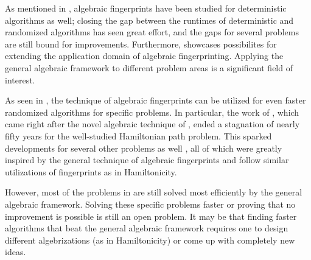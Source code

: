 As mentioned in , algebraic fingerprints 
have been studied for deterministic algorithms as well; closing 
the gap between the runtimes of deterministic and randomized algorithms 
has seen great effort, and the gaps for several problems are still bound for improvements.
Furthermore,  showcases possibilites for extending the 
application domain of algebraic fingerprinting. Applying the general algebraic framework 
to different problem areas is a significant field of interest.

As seen in , 
the technique of algebraic fingerprints can be utilized for even 
faster randomized algorithms for specific problems. 
In particular, the work of \citeauthor{Björklund14}, which came right
after the novel algebraic technique of \cite{Koutis08}, ended a stagnation of 
nearly fifty years for the well-studied Hamiltonian path problem. 
This sparked developments for several other 
problems as well \cite{Björklund17}, all of which were greatly inspired by 
the general technique of algebraic fingerprints and 
follow similar utilizations of fingerprints as in Hamiltonicity.

However, most of the problems in  are still 
solved most efficiently by the general algebraic framework. Solving these 
specific problems faster or proving that no
improvement is possible 
is still an open problem. 
It may be that 
finding faster algorithms that beat the general algebraic framework requires 
one to design different algebrizations (as in Hamiltonicity) 
or come up with completely new ideas.
